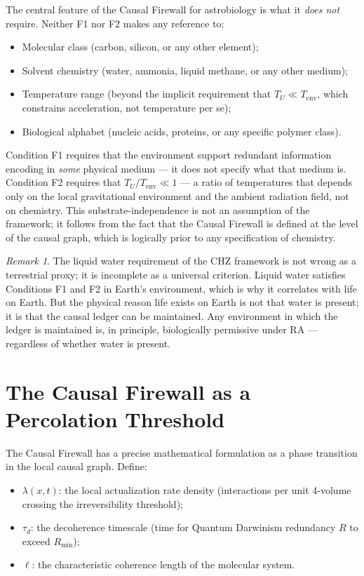 \documentclass[11pt,a4paper]{article}
\theoremstyle{plain}
\theoremstyle{definition}
\theoremstyle{remark}
\newtheorem{remark}[theorem]{Remark}
\begin{document}
The central feature of the Causal Firewall for astrobiology is what it
\emph{does not} require. Neither F1 nor F2 makes any reference to:
\begin{itemize}[noitemsep]
  \item Molecular class (carbon, silicon, or any other element);
  \item Solvent chemistry (water, ammonia, liquid methane, or any other medium);
  \item Temperature range (beyond the implicit requirement that $T_U \ll T_{\mathrm{env}}$,
    which constrains acceleration, not temperature per se);
  \item Biological alphabet (nucleic acids, proteins, or any specific polymer class).
\end{itemize}
Condition F1 requires that the environment support redundant information
encoding in \emph{some} physical medium --- it does not specify what that
medium is. Condition F2 requires that $T_U/T_{\mathrm{env}} \ll 1$ --- a
ratio of temperatures that depends only on the local gravitational environment
and the ambient radiation field, not on chemistry. This substrate-independence
is not an assumption of the framework; it follows from the fact that the
Causal Firewall is defined at the level of the causal graph, which is logically
prior to any specification of chemistry.

\begin{remark}
The liquid water requirement of the CHZ framework is not wrong as a
terrestrial proxy; it is incomplete as a universal criterion. Liquid water
satisfies Conditions F1 and F2 in Earth's environment, which is why it
correlates with life on Earth. But the physical reason life exists on
Earth is not that water is present; it is that the causal ledger can be
maintained. Any environment in which the ledger is maintained is, in
principle, biologically permissive under RA --- regardless of whether
water is present.
\end{remark}

\section{The Causal Firewall as a Percolation Threshold}
\label{sec:percolation}

The Causal Firewall has a precise mathematical formulation as a phase
transition in the local causal graph. Define:
\begin{itemize}[noitemsep]
  \item $\lambda(x,t)$: the local actualization rate density (interactions
    per unit 4-volume crossing the irreversibility threshold);
  \item $\tau_d$: the decoherence timescale (time for Quantum Darwinism
    redundancy $R$ to exceed $R_{\min}$);
  \item $\ell$: the characteristic coherence length of the molecular system.
\end{itemize}
\end{document}
